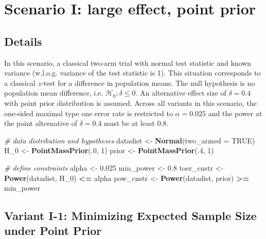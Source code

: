 \documentclass[
]{book}
\newenvironment{Shaded}{\begin{snugshade}}{\end{snugshade}}
\newcommand{\CommentTok}[1]{\textcolor[rgb]{0.56,0.35,0.01}{\textit{#1}}}
\newcommand{\DataTypeTok}[1]{\textcolor[rgb]{0.13,0.29,0.53}{#1}}
\newcommand{\DecValTok}[1]{\textcolor[rgb]{0.00,0.00,0.81}{#1}}
\newcommand{\FloatTok}[1]{\textcolor[rgb]{0.00,0.00,0.81}{#1}}
\newcommand{\KeywordTok}[1]{\textcolor[rgb]{0.13,0.29,0.53}{\textbf{#1}}}
\newcommand{\NormalTok}[1]{#1}
\newcommand{\OperatorTok}[1]{\textcolor[rgb]{0.81,0.36,0.00}{\textbf{#1}}}
\newcommand{\OtherTok}[1]{\textcolor[rgb]{0.56,0.35,0.01}{#1}}
\newcommand{\StringTok}[1]{\textcolor[rgb]{0.31,0.60,0.02}{#1}}
\begin{document}
\hypertarget{scenarioI}{%
\chapter{Scenario I: large effect, point prior}\label{scenarioI}}

\hypertarget{details}{%
\section{Details}\label{details}}

In this scenario, a classical two-arm trial with normal
test statistic and known variance (w.l.o.g. variance of
the test statistic is 1).
This situation corresponds to a classical \(z\)-test for
a difference in population means.
The null hypothesis is no population mean difference, i.e.
\(\mathcal{H}_0:\delta \leq 0\).
An alternative effect size of \(\delta = 0.4\) with
point prior distribution is assumed.
Across all variants in this scenario, the one-sided maximal
type one error rate is restricted to \(\alpha=0.025\)
and the power at the point alternative of \(\delta=0.4\) must
be at least \(0.8\).

\begin{Shaded}
\begin{Highlighting}[]
\CommentTok{\# data distribution and hypotheses}
\NormalTok{datadist   \textless{}{-}}\StringTok{ }\KeywordTok{Normal}\NormalTok{(}\DataTypeTok{two\_armed =} \OtherTok{TRUE}\NormalTok{)}
\NormalTok{H\_}\DecValTok{0}\NormalTok{        \textless{}{-}}\StringTok{ }\KeywordTok{PointMassPrior}\NormalTok{(.}\DecValTok{0}\NormalTok{, }\DecValTok{1}\NormalTok{)}
\NormalTok{prior      \textless{}{-}}\StringTok{ }\KeywordTok{PointMassPrior}\NormalTok{(.}\DecValTok{4}\NormalTok{, }\DecValTok{1}\NormalTok{)}

\CommentTok{\# define constraints}
\NormalTok{alpha      \textless{}{-}}\StringTok{ }\FloatTok{0.025}
\NormalTok{min\_power  \textless{}{-}}\StringTok{ }\FloatTok{0.8}
\NormalTok{toer\_cnstr \textless{}{-}}\StringTok{ }\KeywordTok{Power}\NormalTok{(datadist, H\_}\DecValTok{0}\NormalTok{)   }\OperatorTok{\textless{}=}\StringTok{ }\NormalTok{alpha}
\NormalTok{pow\_cnstr  \textless{}{-}}\StringTok{ }\KeywordTok{Power}\NormalTok{(datadist, prior) }\OperatorTok{\textgreater{}=}\StringTok{ }\NormalTok{min\_power}
\end{Highlighting}
\end{Shaded}

\hypertarget{variantI_1}{%
\section{Variant I-1: Minimizing Expected Sample Size under Point Prior}\label{variantI_1}}
\end{document}

